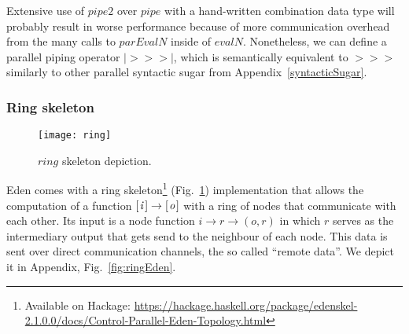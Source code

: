 \documentclass{jfp1}
\newcommand{\Varid}[1]{\mathit{#1}}
\begin{document}
Extensive use of \ensuremath{\Varid{pipe2}} over \ensuremath{\Varid{pipe}} with a hand-written combination data type will probably result in worse performance because of more communication overhead from the many calls to \ensuremath{\Varid{parEvalN}} inside of \ensuremath{\Varid{evalN}}. Nonetheless, we can define a parallel piping operator \ensuremath{\mathbin{|\!>\!\!>\!\!>\!|}}, which is semantically equivalent to \ensuremath{\mathbin{>\!\!>\!\!>}} similarly to other parallel syntactic sugar from Appendix~\ref{syntacticSugar}.



\subsubsection{Ring skeleton} \label{sec:ring}
\begin{figure}[tb]
	\texttt{[image: ring]}
	\caption{\ensuremath{\Varid{ring}} skeleton depiction.}
	\label{fig:ringImg}
\end{figure}
Eden comes with a ring skeleton\footnote{Available on Hackage: \url{https://hackage.haskell.org/package/edenskel-2.1.0.0/docs/Control-Parallel-Eden-Topology.html}} (Fig.~\ref{fig:ringImg}) implementation that allows the computation of a function \ensuremath{[\mskip1.5mu \Varid{i}\mskip1.5mu]\to [\mskip1.5mu \Varid{o}\mskip1.5mu]} with a ring of nodes that communicate with each other. Its input is a node function \ensuremath{\Varid{i}\to \Varid{r}\to (\Varid{o},\Varid{r})} in which \ensuremath{\Varid{r}} serves as the intermediary output that gets send to the neighbour of each node. This data is sent over direct communication channels, the so called \enquote{remote data}. We depict it in Appendix, Fig.~\ref{fig:ringEden}.
\end{document}
